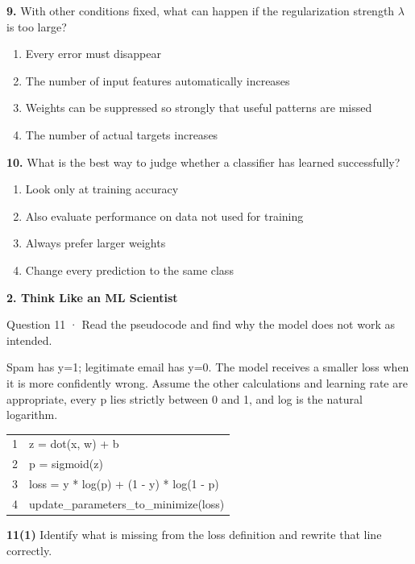 \documentclass[11pt,a4paper]{article}
\newcommand{\parttitle}[2]{{\large\bfseries\color{ink} #1}\par{\small #2}\par\vspace{5mm}}
\newcommand{\question}[2]{\textbf{#1.} #2\par}
\begin{document}
\question{9}{With other conditions fixed, what can happen if the regularization strength $\lambda$ is too large?}
\begin{enumerate}[label=(\arabic*),leftmargin=9mm,itemsep=0pt,topsep=2pt,parsep=0pt]
\item Every error must disappear
\item The number of input features automatically increases
\item Weights can be suppressed so strongly that useful patterns are missed
\item The number of actual targets increases
\end{enumerate}\vfill
\question{10}{What is the best way to judge whether a classifier has learned successfully?}
\begin{enumerate}[label=(\arabic*),leftmargin=9mm,itemsep=0pt,topsep=2pt,parsep=0pt]
\item Look only at training accuracy
\item Also evaluate performance on data not used for training
\item Always prefer larger weights
\item Change every prediction to the same class
\end{enumerate}\vfill
\newpage
\parttitle{2. Think Like an ML Scientist}{Question 11 · Read the pseudocode and find why the model does not work as intended.}
Spam has y=1; legitimate email has y=0. The model receives a smaller loss when it is more confidently wrong. Assume the other calculations and learning rate are appropriate, every p lies strictly between 0 and 1, and log is the natural logarithm.
\par\vspace{3mm}
{\small\ttfamily\begin{tabular}{r l}
1 & \hspace*{0.0mm}z = dot(x, w) + b \\
2 & \hspace*{0.0mm}p = sigmoid(z) \\
3 & \hspace*{0.0mm}loss = y * log(p) + (1 - y) * log(1 - p) \\
4 & \hspace*{0.0mm}update\_parameters\_to\_minimize(loss) \\
\end{tabular}}\par\vspace{5mm}
\textbf{11(1)} Identify what is missing from the loss definition and rewrite that line correctly.
\end{document}
